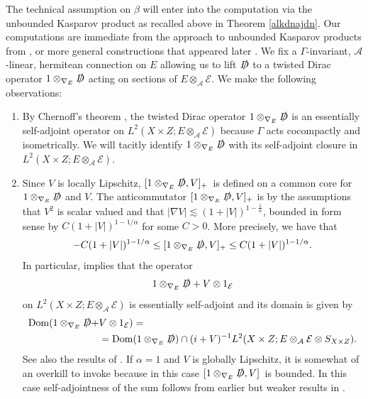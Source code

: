 \documentclass[a4paper,reqno]{amsart}
\numberwithin{equation}{section}
\def\Dom{\operatorname{Dom}}
\theoremstyle{definition}
\theoremstyle{remark}
\begin{document}
The technical assumption on $\beta$ will enter into the computation via the unbounded Kasparov product as recalled above in Theorem \ref{alkdnajdn}. Our computations are immediate from the approach to unbounded Kasparov products from \cite{thebeastofmesland}, or more general constructions that appeared later \cite{leschkaadlocal,leschkaadsf,leschmes}. We fix a $\Gamma$-invariant, $\mathcal{A}$-linear, hermitean connection on $E$ allowing us to lift $\slashed{D}$ to a twisted Dirac operator $1\otimes_{\nabla_E}\slashed{D}$ acting on sections of $E\otimes_{\mathcal{A}} \mathcal{E}$. We make the following observations:
\begin{enumerate}
\item By Chernoff's theorem \cite{chernoffjfa}, the twisted Dirac operator $1\otimes_{\nabla_E}\slashed{D}$ is an essentially self-adjoint operator on $L^2(X\times Z;E\otimes_{\mathcal{A}} \mathcal{E})$ because $\Gamma$ acts cocompactly and isometrically. We will tacitly identify $1\otimes_{\nabla_E}\slashed{D}$ with its self-adjoint closure in $L^2(X\times Z;E\otimes_{\mathcal{A}} \mathcal{E})$.
\item Since $V$ is locally Lipschitz, $[1\otimes_{\nabla_E}\slashed{D},V]_+$ is defined on a common core for $1\otimes_{\nabla_E}\slashed{D}$ and $V$. The anticommutator $[1\otimes_{\nabla_E}\slashed{D},V]_+$ is by the assumptions that $V^2$ is scalar valued and that $|\nabla V|\lesssim (1+|V|)^{1-\frac{1}{\alpha}}$, bounded in form sense by $C(1+|V|)^{1-1/\alpha}$ for some $C>0$. More precisely, we have that 
\begin{equation}
\label{lowered}
-C(1+|V|)^{1-1/\alpha}\leq [1\otimes_{\nabla_E}\slashed{D},V]_+\leq C(1+|V|)^{1-1/\alpha}.
\end{equation}
In particular, \cite[Theorem 1.1]{leschmes} implies that the operator 
$$1\otimes_{\nabla_E}\slashed{D}+V\otimes 1_{\mathcal{E}}$$
on $L^2(X\times Z;E\otimes_{\mathcal{A}} \mathcal{E})$ is essentially self-adjoint and its domain is given by 
\begin{align}
\label{adadklnln}
\Dom(1\otimes_{\nabla_E}\slashed{D}+&V\otimes 1_{\mathcal{E}})=\\
\nonumber
&=\Dom(1\otimes_{\nabla_E}\slashed{D})\cap (i+V)^{-1}L^2(X\times Z;E\otimes_{\mathcal{A}} \mathcal{E}\otimes S_{X\times Z}).
\end{align}
See also the results of \cite[Section 7]{leschkaadlocal}. If $\alpha=1$ and $V$ is globally Lipschitz,  it is somewhat of an overkill to invoke \cite[Theorem 1.1]{leschmes} because in this case $[1\otimes_{\nabla_E}\slashed{D},V]$ is bounded. In this case self-adjointness of the sum follows from earlier but weaker results in \cite{thebeastofmesland}.

\end{enumerate}
\end{document}
